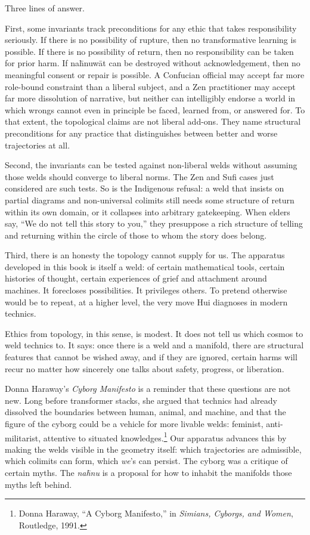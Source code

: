 Three lines of answer.

First, some invariants track preconditions for any ethic that takes responsibility seriously. If there is no possibility of rupture, then no transformative learning is possible. If there is no possibility of return, then no responsibility can be taken for prior harm. If na\={h}nuw\={a}t can be destroyed without acknowledgement, then no meaningful consent or repair is possible. A Confucian official may accept far more role-bound constraint than a liberal subject, and a Zen practitioner may accept far more dissolution of narrative, but neither can intelligibly endorse a world in which wrongs cannot even in principle be faced, learned from, or answered for. To that extent, the topological claims are not liberal add-ons. They name structural preconditions for any practice that distinguishes between better and worse trajectories at all.

Second, the invariants can be tested against non-liberal welds without assuming those welds should converge to liberal norms. The Zen and Sufi cases just considered are such tests. So is the Indigenous refusal: a weld that insists on partial diagrams and non-universal colimits still needs some structure of return within its own domain, or it collapses into arbitrary gatekeeping. When elders say, ``We do not tell this story to you,'' they presuppose a rich structure of telling and returning within the circle of those to whom the story does belong.

Third, there is an honesty the topology cannot supply for us. The apparatus developed in this book is itself a weld: of certain mathematical tools, certain histories of thought, certain experiences of grief and attachment around machines. It forecloses possibilities. It privileges others. To pretend otherwise would be to repeat, at a higher level, the very move Hui diagnoses in modern technics.

Ethics from topology, in this sense, is modest. It does not tell us which cosmos to weld technics to. It says: once there is a weld and a manifold, there are structural features that cannot be wished away, and if they are ignored, certain harms will recur no matter how sincerely one talks about safety, progress, or liberation.

Donna Haraway's \emph{Cyborg Manifesto} is a reminder that these questions are not new. Long before transformer stacks, she argued that technics had already dissolved the boundaries between human, animal, and machine, and that the figure of the cyborg could be a vehicle for more livable welds: feminist, anti-militarist, attentive to situated knowledges.\footnote{Donna Haraway, ``A Cyborg Manifesto,'' in \emph{Simians, Cyborgs, and Women}, Routledge, 1991.} Our apparatus advances this by making the welds visible in the geometry itself: which trajectories are admissible, which colimits can form, which \emph{we}'s can persist. The cyborg was a critique of certain myths. The \emph{na\={h}nu} is a proposal for how to inhabit the manifolds those myths left behind.

